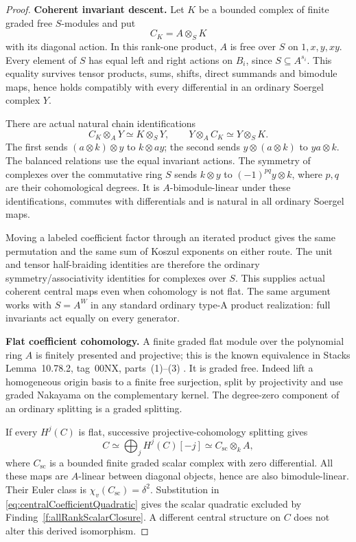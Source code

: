 \begin{proof}
\par\smallskip\noindent\textbf{Coherent invariant descent.}\quad
Let \(K\) be a bounded complex of finite graded
free \(S\)-modules and put
\[
                         C_K=A\otimes_S K
\]
with its diagonal action. In this rank-one product,
\(A\) is free over \(S\) on \(1,x,y,xy\).
Every element of \(S\) has equal left and right
actions on \(B_i\), since \(S\subseteq A^{s_i}\).
This equality survives tensor products, sums,
shifts, direct summands and bimodule maps, hence
holds compatibly with every differential in an
ordinary Soergel complex \(Y\).

There are actual natural chain identifications
\begin{equation}\label{eq:centralCoefficientMovement}
 C_K\otimes_A Y\simeq K\otimes_S Y,
 \qquad
 Y\otimes_A C_K\simeq Y\otimes_S K.
\end{equation}
The first sends \((a\otimes k)\otimes y\) to
\(k\otimes ay\); the second sends
\(y\otimes(a\otimes k)\) to \(ya\otimes k\).
The balanced relations use the equal invariant
actions. The symmetry of complexes over the
commutative ring \(S\) sends
\(k\otimes y\) to \((-1)^{pq}y\otimes k\), where
\(p,q\) are their cohomological degrees.
It is \(A\)-bimodule-linear under these identifications,
commutes with differentials and is natural in all
ordinary Soergel maps.

Moving a labeled coefficient factor through an
iterated product gives the same permutation and
the same sum of Koszul exponents on either route.
The unit and tensor half-braiding identities are
therefore the ordinary symmetry/associativity
identities for complexes over \(S\).
This supplies actual coherent central maps even
when cohomology is not flat.
The same argument works with \(S=A^W\) in any
standard ordinary type-A product realization:
full invariants act equally on every generator.

\par\smallskip\noindent\textbf{Flat coefficient cohomology.}\quad
A finite graded flat module over the polynomial
ring \(A\) is finitely presented and projective;
this is the known equivalence in Stacks
Lemma~10.78.2, tag~00NX, parts~(1)--(3)
\cite{StacksFiniteProjective}.
It is graded free. Indeed lift a homogeneous
origin basis to a finite free surjection, split
by projectivity and use graded Nakayama on the
complementary kernel. The degree-zero component
of an ordinary splitting is a graded splitting.

If every \(H^j(C)\) is flat, successive
projective-cohomology splitting gives
\begin{equation}\label{eq:centralCoefficientScalarReduction}
 C\simeq\bigoplus_jH^j(C)[-j]
      \simeq C_{\mathrm{sc}}\otimes_k A,
\end{equation}
where \(C_{\mathrm{sc}}\) is a bounded finite
graded scalar complex with zero differential.
All these maps are \(A\)-linear between diagonal
objects, hence are also bimodule-linear.
Their Euler class is \(\chi_v(C_{\mathrm{sc}})=\delta^2\).
Substitution in
\eqref{eq:centralCoefficientQuadratic} gives the
scalar quadratic excluded by
Finding~\ref{f:allRankScalarClosure}.
A different central structure on \(C\) does not
alter this derived isomorphism.


\end{proof}
